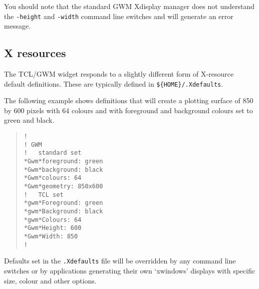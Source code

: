 You should note that the standard GWM Xdisplay manager does not understand the
{\tt{-height}} and {\tt{-width}} command line switches and will generate an
error message.

\subsection{\label{x_resources}X resources}

The TCL/GWM widget responds to a slightly different form of X-resource
default definitions.  These are typically defined in 
{\verb+${HOME}/.Xdefaults+}.

The following example shows definitions that will create a plotting
surface of 850 by 600 pixels with 64 colours and with foreground and
background colours set to green and black.

\begin{quote}
\begin{verbatim}
!
! GWM 
!   standard set
*Gwm*foreground: green
*Gwm*background: black
*Gwm*colours: 64
*Gwm*geometry: 850x600
!   TCL set
*gwm*Foreground: green
*gwm*Background: black
*gwm*Colours: 64
*Gwm*Height: 600
*Gwm*Width: 850
!
\end{verbatim}
\end{quote}

Defaults set in the {\tt{.Xdefaults}} file will be overridden by any
command line switches or by applications generating their own `xwindows'
displays with specific size, colour and other options.


